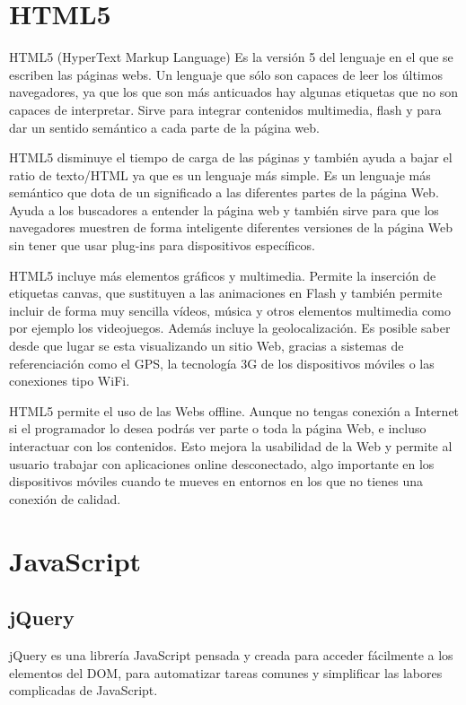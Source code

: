 \documentclass[a4paper, 12pt]{book}
\begin{document}
\section{HTML5}
\label{sec:html5}
HTML5 (HyperText Markup Language) Es la versi\'on 5 del lenguaje en el que se escriben las p\'aginas webs. Un lenguaje que s\'olo son capaces 
de leer los \'ultimos navegadores, ya que los que son m\'as anticuados hay algunas etiquetas que no son capaces de interpretar. Sirve para integrar 
contenidos multimedia, flash y para dar un sentido sem\'antico a cada parte de la p\'agina web.

HTML5 disminuye el tiempo de carga de las p\'aginas y tambi\'en ayuda a bajar el ratio de texto/HTML ya que es un lenguaje m\'as simple.
Es un lenguaje m\'as sem\'antico que dota de un significado a las diferentes partes de la p\'agina Web. Ayuda a los buscadores a entender la p\'agina 
web y tambi\'en sirve para que los navegadores muestren de forma inteligente diferentes versiones de la p\'agina Web sin tener que usar plug-ins para 
dispositivos espec\'ificos.

HTML5 incluye m\'as elementos gr\'aficos y multimedia. Permite la inserci\'on de etiquetas canvas, que sustituyen a las animaciones en Flash y tambi\'en 
permite incluir de forma muy sencilla v\'ideos, m\'usica y otros elementos multimedia como por ejemplo los videojuegos. Adem\'as incluye la 
geolocalizaci\'on. Es posible saber desde que lugar se esta visualizando un sitio Web, gracias a sistemas de referenciaci\'on como el GPS, 
la tecnolog\'ia 3G de los dispositivos m\'oviles o las conexiones tipo WiFi.

HTML5 permite el uso de las Webs offline. Aunque no tengas conexi\'on a Internet si el programador lo desea podr\'as ver parte o toda la p\'agina Web, 
e incluso interactuar con los contenidos. Esto mejora la usabilidad de la Web y permite al usuario trabajar con aplicaciones online desconectado, 
algo importante en los dispositivos m\'oviles cuando te mueves en entornos en los que no tienes una conexi\'on de calidad.


\section{JavaScript}
\label{sec:javascript}


\subsection{jQuery}
\label{subsec:jquery}
jQuery es una librer\'ia JavaScript pensada y creada para acceder f\'acilmente a los elementos del DOM, para automatizar tareas comunes 
y simplificar las labores complicadas de JavaScript.
\end{document}
